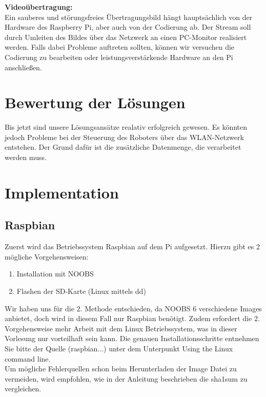 \documentclass[12pt]{article}
\begin{document}
\vspace{0,6cm}

{\bf Videoübertragung:}\\
Ein sauberes und störungsfreies Übertragungsbild hängt hauptsächlich von der Hardware des Raspberry Pi, aber auch von der Codierung ab. Der Stream soll durch  Umleiten des Bildes über das Netzwerk an einen PC-Monitor realisiert werden. Falls dabei Probleme auftreten sollten, können wir versuchen die Codierung zu bearbeiten oder leistungsverstärkende Hardware an den Pi anschließen.




\section{Bewertung der Lösungen}

Bis jetzt sind unsere Lösungsansätze realativ erfolgreich gewesen. Es könnten jedoch Probleme bei der Steuerung des Roboters über das WLAN-Netzwerk entstehen. Der Grund dafür ist die zusätzliche Datenmenge, die verarbeitet werden muss.

\section{Implementation}

\subsection{Raspbian}

Zuerst wird das Betriebssystem Raspbian auf dem Pi aufgesetzt.
Hierzu gibt es 2 mögliche Vorgehensweisen:
\begin{enumerate}
\item Installation mit NOOBS
\item Flashen der SD-Karte (Linux mittels dd)
\end{enumerate}

Wir haben uns für die 2. Methode entschieden, da NOOBS 6 verschiedene Images anbietet, doch wird in diesem Fall nur Raspbian benötigt.
Zudem erfordert die 2. Vorgehensweise mehr Arbeit mit dem Linux Betriebssystem, was in dieser Vorlesung nur vorteilhaft sein kann.
Die genauen Installationsschritte entnehmen Sie bitte der Quelle (raspbian...) unter dem Unterpunkt Using the Linux command line. \\
Um mögliche Fehlerquellen schon beim Herunterladen der Image Datei zu vermeiden, wird empfohlen, wie in der Anleitung beschrieben die sha1sum zu vergleichen.
\end{document}
